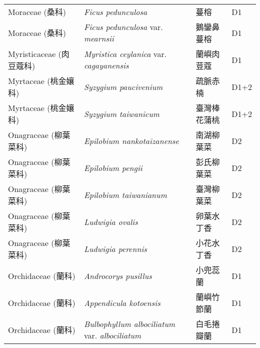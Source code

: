\begin{longtable}{p{3cm}p{5cm}p{3cm}p{4cm}}
    Moraceae (桑科) & \textit{Ficus pedunculosa}  & 蔓榕 & D1 \index{Ficus@\textit{Ficus}!pedunculosa@\textit{pedunculosa}}  \index{蔓榕} \\
    Moraceae (桑科) & \textit{Ficus pedunculosa} var. \textit{mearnsii}  & 鵝鑾鼻蔓榕 & D1 \index{Ficus@\textit{Ficus}!pedunculosa@\textit{pedunculosa}!var. mearnsii@var. \textit{mearnsii}}  \index{鵝鑾鼻蔓榕} \\
    Myristicaceae (肉豆蔻科) & \textit{Myristica ceylanica} var. \textit{cagayanensis}  & 蘭嶼肉荳蔻 & D1 \index{Myristica@\textit{Myristica}!ceylanica@\textit{ceylanica}!var. cagayanensis@var. \textit{cagayanensis}}  \index{蘭嶼肉荳蔻} \\
    Myrtaceae (桃金孃科) & \textit{Syzygium paucivenium}  & 疏脈赤楠 & D1+2 \index{Syzygium@\textit{Syzygium}!paucivenium@\textit{paucivenium}}  \index{疏脈赤楠} \\
    Myrtaceae (桃金孃科) & \textit{Syzygium taiwanicum}  & 臺灣棒花蒲桃 & D1+2 \index{Syzygium@\textit{Syzygium}!taiwanicum@\textit{taiwanicum}}  \index{臺灣棒花蒲桃} \\
    Onagraceae (柳葉菜科) & \textit{Epilobium nankotaizanense}  & 南湖柳葉菜 & D2 \index{Epilobium@\textit{Epilobium}!nankotaizanense@\textit{nankotaizanense}}  \index{南湖柳葉菜} \\
    Onagraceae (柳葉菜科) & \textit{Epilobium pengii}  & 彭氏柳葉菜 & D2 \index{Epilobium@\textit{Epilobium}!pengii@\textit{pengii}}  \index{彭氏柳葉菜} \\
    Onagraceae (柳葉菜科) & \textit{Epilobium taiwanianum}  & 臺灣柳葉菜 & D2 \index{Epilobium@\textit{Epilobium}!taiwanianum@\textit{taiwanianum}}  \index{臺灣柳葉菜} \\
    Onagraceae (柳葉菜科) & \textit{Ludwigia ovalis}  & 卵葉水丁香 & D2 \index{Ludwigia@\textit{Ludwigia}!ovalis@\textit{ovalis}}  \index{卵葉水丁香} \\
    Onagraceae (柳葉菜科) & \textit{Ludwigia perennis}  & 小花水丁香 & D2 \index{Ludwigia@\textit{Ludwigia}!perennis@\textit{perennis}}  \index{小花水丁香} \\
    Orchidaceae (蘭科) & \textit{Androcorys pusillus}  & 小兜蕊蘭 & D1 \index{Androcorys@\textit{Androcorys}!pusillus@\textit{pusillus}}  \index{小兜蕊蘭} \\
    Orchidaceae (蘭科) & \textit{Appendicula kotoensis}  & 蘭嶼竹節蘭 & D1 \index{Appendicula@\textit{Appendicula}!kotoensis@\textit{kotoensis}}  \index{蘭嶼竹節蘭} \\
    Orchidaceae (蘭科) & \textit{Bulbophyllum albociliatum} var. \textit{albociliatum}  & 白毛捲瓣蘭 & D1 \index{Bulbophyllum@\textit{Bulbophyllum}!albociliatum@\textit{albociliatum}!var. albociliatum@var. \textit{albociliatum}}  \index{白毛捲瓣蘭} \\

\end{longtable}
